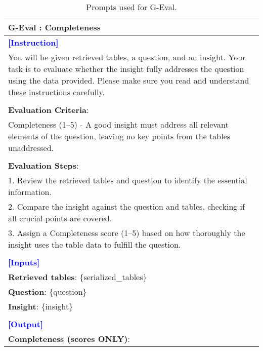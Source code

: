 \begin{table*}[htbp]
\begin{tabularx}{\textwidth}{X}
\textbf{G-Eval : Completeness} \\ \midrule
\textcolor{blue}{\textbf{[Instruction]}} \\
You will be given retrieved tables, a question, and an insight. Your task is to evaluate whether the insight fully addresses the question using the data provided. Please make sure you read and understand these instructions carefully. \\\\
\textbf{Evaluation Criteria}: \\
Completeness (1–5) - A good insight must address all relevant elements of the question, leaving no key points from the tables unaddressed. \\\\
\textbf{Evaluation Steps}: \\
1. Review the retrieved tables and question to identify the essential information. \\
2. Compare the insight against the question and tables, checking if all crucial points are covered. \\
3. Assign a Completeness score (1–5) based on how thoroughly the insight uses the table data to fulfill the question. \\\\
\textcolor{blue}{\textbf{[Inputs]}} \\
\textbf{Retrieved tables}: \{serialized\_tables\} \\
\textbf{Question}: \{question\} \\
\textbf{Insight}: \{insight\} \\\\
\textcolor{blue}{\textbf{[Output]}} \\
\textbf{Completeness (scores ONLY)}: \\
\bottomrule
\end{tabularx}
\caption{Prompts used for G-Eval.}
\label{pmt:apx_geval}
\end{table*}